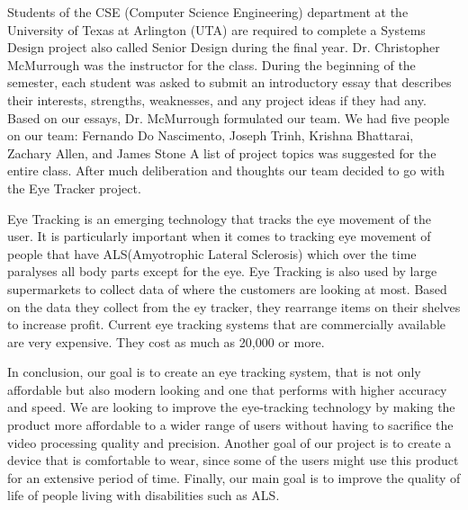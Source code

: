 Students of the CSE (Computer Science Engineering) department at the University of Texas at Arlington (UTA) are required to complete a Systems Design project also called \“Senior Design\” during the final year. Dr. Christopher McMurrough was the instructor for the class. During the beginning of the semester, each student was asked to submit an introductory essay that describes their interests, strengths, weaknesses, and any project ideas if they had any. Based on our essays, Dr. McMurrough formulated our team. We had five people on our team: Fernando Do Nascimento, Joseph Trinh, Krishna Bhattarai, Zachary Allen, and James Stone
A list of project topics was suggested for the entire class. After much deliberation and thoughts our team decided to go with the Eye Tracker project.

Eye Tracking is an emerging technology that tracks the eye movement of the user. It is particularly important when it comes to tracking eye movement of people that have ALS(Amyotrophic Lateral Sclerosis) which over the time paralyses all body parts except for the eye. Eye Tracking is also used by large supermarkets to collect data of where the customers are looking at most. Based on the data they collect from the ey tracker, they rearrange items on their shelves to increase profit. Current eye tracking systems that are commercially available are very expensive. They cost as much as 20,000 or more. 

In conclusion, our goal is to create an eye tracking system, that is not only affordable but also modern looking and one that performs with higher accuracy and speed. We are looking to improve the eye-tracking technology by making the product more affordable to a wider range of users without having to sacrifice the video processing quality and precision. Another goal of our project is to create a device that is comfortable to wear, since some of the users might use this product for an extensive period of time. Finally, our main goal is to improve the quality of life of people living with disabilities such as ALS.